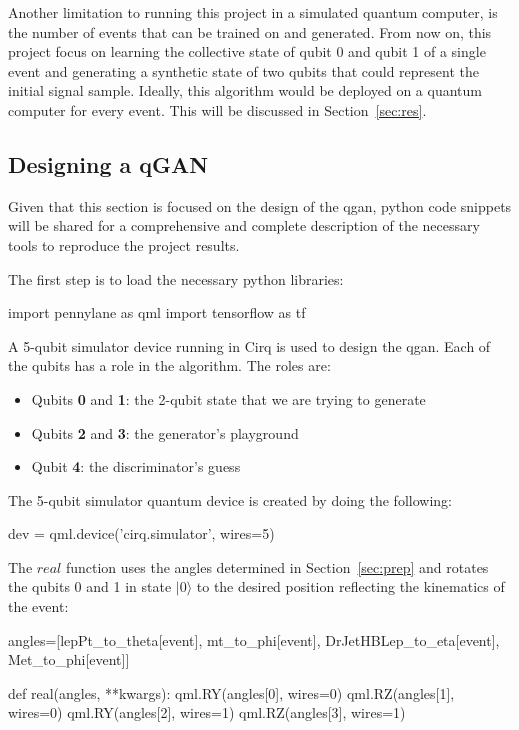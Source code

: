 Another limitation to running this project in a simulated quantum computer, is
the number of events that can be trained on and generated. From now on, this
project focus on learning the collective state of qubit 0 and qubit 1 of a 
single event and generating a synthetic state of two qubits that could represent
the initial signal sample. Ideally, this algorithm would be deployed on a quantum
computer for every event. This will be discussed in Section~\ref{sec:res}.

\subsection{Designing a qGAN}
\label{sec:qgan}

Given that this section is focused on the design of the \gls{qgan}, python code 
snippets will be shared for a comprehensive and complete description of the 
necessary tools to reproduce the project results.

The first step is to load the necessary python libraries:
\begin{python}
import pennylane as qml
import tensorflow as tf
\end{python}

A 5-qubit simulator device running in Cirq is used to design the \gls{qgan}. Each
of the qubits has a role in the algorithm. The roles are:
\begin{itemize}
    \item Qubits \textbf{0} and \textbf{1}: the 2-qubit state that we are trying
    to generate
    \item Qubits \textbf{2} and \textbf{3}: the generator's playground
    \item Qubit \textbf{4}: the discriminator's guess
\end{itemize}

The 5-qubit simulator quantum device is created by doing the following:

\begin{python}
dev = qml.device('cirq.simulator', wires=5)
\end{python}

The $real$ function uses the angles determined in Section~\ref{sec:prep} and 
rotates the qubits 0 and 1 in state $\vert 0 \rangle$ to the desired position 
reflecting the kinematics of the event:
\begin{python}
angles=[lepPt_to_theta[event],
        mt_to_phi[event],
        DrJetHBLep_to_eta[event],
        Met_to_phi[event]]

def real(angles, **kwargs):
    qml.RY(angles[0], wires=0)
    qml.RZ(angles[1], wires=0)
    qml.RY(angles[2], wires=1)
    qml.RZ(angles[3], wires=1)
\end{python}

